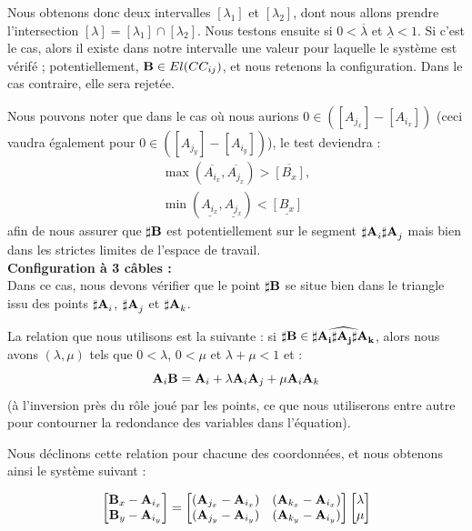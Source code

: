 Nous obtenons donc deux intervalles $[\lambda_1]$ et $[\lambda_2]$, dont nous 
allons prendre l'intersection $[\lambda] = [\lambda_1] \cap [\lambda_2]$. Nous 
testons ensuite si $0 < \overline{\lambda}$ et $\underline{\lambda} < 1$. Si 
c'est le cas, alors il existe dans notre intervalle une valeur pour laquelle le 
syst\`eme est v\'erif\'e ; potentiellement, ${\bf B} \in El(CC_{ij})$, et nous 
retenons la configuration. Dans le cas contraire, elle sera rejet\'ee.

Nous pouvons noter que dans le cas o\`u nous aurions $0 \in ([A_{j_x}] - 
[A_{i_x}])$ (ceci vaudra \'egalement pour $0 \in ([A_{j_y}] - [A_{i_y}])$), le 
test deviendra :
\begin{equation}
\begin{matrix}
\max(\overline{A_{i_x}},\overline{A_{j_x}}) > \overline{[B_x]},\\
\min(\underline{A_{i_x}},\underline{A_{j_x}}) < \underline{[B_x]}
\end{matrix}
\label{chap01:eq17}
\end{equation}
afin de nous assurer que ${\bf \sharp B}$ est potentiellement sur le segment 
${\bf \sharp A}_i{\bf \sharp A}_j$ mais bien dans les strictes limites de 
l'espace de travail.\\

{\bf Configuration \`a 3 c\^ables :}\\

Dans ce cas, nous devons v\'erifier que le point $\bf \sharp B$ se situe bien 
dans le triangle issu des points ${\bf \sharp A}_i$, ${\bf \sharp A}_j$ et 
${\bf \sharp A}_k$.

La relation que nous utilisons est la suivante : si $\bf \sharp B \in 
\widehat{{\bf \sharp A}_i{\bf \sharp A}_j{\bf \sharp A}_k}$, alors nous avons 
$(\lambda, \mu)$ tels que $0 < \lambda$, $0 < \mu$ et $\lambda + \mu < 1$ et :
\begin{equation}
{\bf A}_i {\bf B} = {\bf A}_i + \lambda {\bf A}_i{\bf A}_j + \mu {\bf A}_i{\bf 
A}_k  
\label{chap01:eq17}
\end{equation}
(\`a l'inversion pr\`es du r\^ole jou\'e par les points, ce que nous 
utiliserons entre autre pour contourner la redondance des variables dans 
l'\'equation).

Nous d\'eclinons cette relation pour chacune des coordonn\'ees, et nous 
obtenons ainsi le syst\`eme suivant :

\begin{equation}
\begin{bmatrix}
{\bf B}_{x} - {\bf A}_{i_x} \\
{\bf B}_{y} - {\bf A}_{i_y}
\end{bmatrix} =
\begin{bmatrix}
({\bf A}_{j_x} - {\bf A}_{i_x}) & ({\bf A}_{k_x} - {\bf A}_{i_x}) \\
({\bf A}_{j_y} - {\bf A}_{i_y}) & ({\bf A}_{k_y} - {\bf A}_{i_y})
\end{bmatrix}
\begin{bmatrix}
\lambda \\
\mu
\end{bmatrix}
\label{chap01:eq18}
\end{equation}

